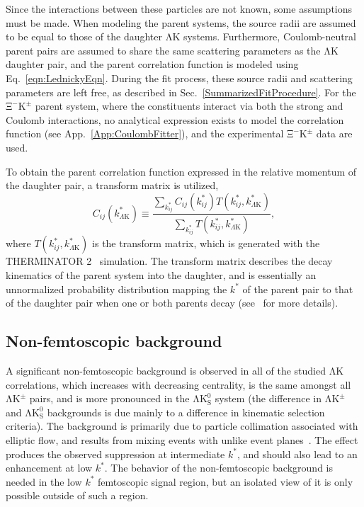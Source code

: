 \documentclass{svproc}
\newcommand{\kstar}{$k^{*}$\xspace}
\newcommand{\LamK}{$\mathrm{\Lambda}\mathrm{K}$\xspace}
\newcommand{\LamKpm}{$\mathrm{\Lambda}\mathrm{K^{\pm}}$\xspace}
\newcommand{\LamKs}{$\mathrm{\Lambda}\mathrm{K^{0}_{S}}$\xspace}
\newcommand{\XiKpm}{$\mathrm{\Xi}^{-}\mathrm{K^{\pm}}$\xspace}
\begin{document}
Since the interactions between these particles are not known, some assumptions must be made.
When modeling the parent systems, the source radii are assumed to be equal to those of the daughter \LamK systems.
Furthermore, Coulomb-neutral parent pairs are assumed to share the same scattering parameters as the \LamK daughter pair, and the parent correlation function is modeled using Eq.~\ref{eqn:LednickyEqn}.
During the fit process, these source radii and scattering parameters are left free, as described in Sec.~\ref{SummarizedFitProcedure}.
For the \XiKpm parent system, where the constituents interact via both the strong and Coulomb interactions, no analytical expression exists to model the correlation function (see App.~\ref{App:CoulombFitter}), and the experimental \XiKpm data are used.


To obtain the parent correlation function expressed in the relative momentum of the daughter pair, a transform matrix is utilized,
\begin{equation}
  C_{ij}(k^{*}_{\Lambda\mathrm{K}}) \equiv \frac{\sum\limits_{k^{*}_{ij}} C_{ij}\left(k^{*}_{ij}\right) T\left(k^{*}_{ij},k^{*}_{\Lambda\mathrm{K}}\right)}{\sum\limits_{k^{*}_{ij}} T\left(k^{*}_{ij},k^{*}_{\Lambda\mathrm{K}}\right)},
\label{eqn:ResidualsTransform}
\end{equation}
where $T(k^{*}_{ij},k^{*}_{\Lambda\mathrm{K}})$ is the transform matrix, which is generated with the THERMINATOR 2~\cite{Chojnacki:2011hb} simulation. 
The transform matrix describes the decay kinematics of the parent system into the daughter, and is essentially an unnormalized probability distribution mapping the \kstar of the parent pair to that of the daughter pair when one or both parents decay (see~\cite{Kisiel:2014mma} for more details).

\subsection{Non-femtoscopic background}
\label{NonFlatBackground}

A significant non-femtoscopic background is observed in all of the studied \LamK correlations, which increases with decreasing centrality, is the same amongst all \LamKpm pairs, and is more pronounced in the \LamKs system (the difference in \LamKpm and \LamKs backgrounds is due mainly to a difference in kinematic selection criteria).  
The background is primarily due to particle collimation associated with elliptic flow, and results from mixing events with unlike event planes~\cite{Kisiel:2017}.
The effect produces the observed suppression at intermediate \kstar, and should also lead to an enhancement at low \kstar.
The behavior of the non-femtoscopic background is needed in the low \kstar femtoscopic signal region, but an isolated view of it is only possible outside of such a region.
\end{document}
